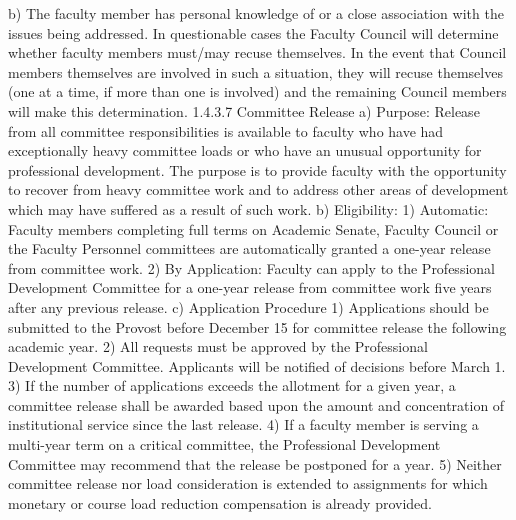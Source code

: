 \documentclass[letterpaper, 11pt]{article}
\begin{document}
b) The faculty member has personal knowledge of or a close association with the issues being addressed.
   In questionable cases the Faculty Council will determine whether faculty members must/may recuse themselves.  In the event that Council members themselves are involved in such a situation, they will recuse themselves (one at a time, if more than one is involved) and the remaining Council members will make this determination.
1.4.3.7 Committee Release
a) Purpose:  Release from all committee responsibilities is available to faculty who have had exceptionally heavy committee loads or who have an unusual opportunity for professional development.  The purpose is to provide faculty with the opportunity to recover from heavy committee work and to address other areas of development which may have suffered as a result of such work.
b) Eligibility:
1) Automatic:  Faculty members completing full terms on Academic Senate, Faculty Council or the Faculty Personnel committees are automatically granted a one-year release from committee work.
2) By Application:  Faculty can apply to the Professional Development Committee for a one-year release from committee work five years after any previous release.
c) Application Procedure
1) Applications should be submitted to the Provost before December 15 for committee release the following academic year.
2) All requests must be approved by the Professional Development Committee.  Applicants will be notified of decisions before March 1.
3) If the number of applications exceeds the allotment for a given year, a committee release shall be awarded based upon the amount and concentration of institutional service since the last release.
4) If a faculty member is serving a multi-year term on a critical committee, the Professional Development Committee may recommend that the release be postponed for a year.
5) Neither committee release nor load consideration is extended to assignments for which monetary or course load reduction compensation is already provided.
\end{document}
